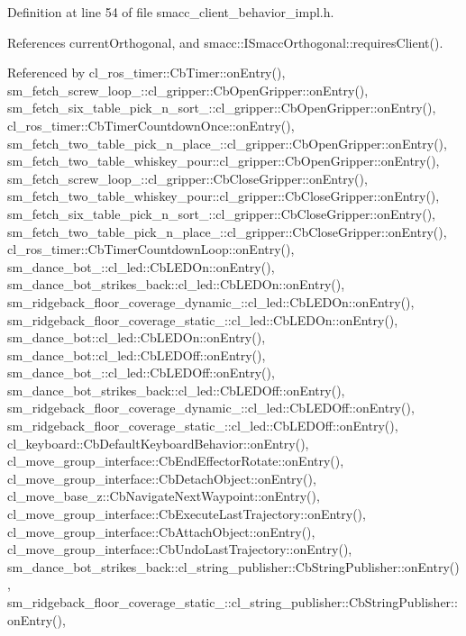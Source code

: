 Definition at line 54 of file smacc\+\_\+client\+\_\+behavior\+\_\+impl.\+h.



References current\+Orthogonal, and smacc\+::\+I\+Smacc\+Orthogonal\+::requires\+Client().



Referenced by cl\+\_\+ros\+\_\+timer\+::\+Cb\+Timer\+::on\+Entry(), sm\+\_\+fetch\+\_\+screw\+\_\+loop\+\_\+::cl\+\_\+gripper\+::\+Cb\+Open\+Gripper\+::on\+Entry(), sm\+\_\+fetch\+\_\+six\+\_\+table\+\_\+pick\+\_\+n\+\_\+sort\+\_\+::cl\+\_\+gripper\+::\+Cb\+Open\+Gripper\+::on\+Entry(), cl\+\_\+ros\+\_\+timer\+::\+Cb\+Timer\+Countdown\+Once\+::on\+Entry(), sm\+\_\+fetch\+\_\+two\+\_\+table\+\_\+pick\+\_\+n\+\_\+place\+\_\+::cl\+\_\+gripper\+::\+Cb\+Open\+Gripper\+::on\+Entry(), sm\+\_\+fetch\+\_\+two\+\_\+table\+\_\+whiskey\+\_\+pour\+::cl\+\_\+gripper\+::\+Cb\+Open\+Gripper\+::on\+Entry(), sm\+\_\+fetch\+\_\+screw\+\_\+loop\+\_\+::cl\+\_\+gripper\+::\+Cb\+Close\+Gripper\+::on\+Entry(), sm\+\_\+fetch\+\_\+two\+\_\+table\+\_\+whiskey\+\_\+pour\+::cl\+\_\+gripper\+::\+Cb\+Close\+Gripper\+::on\+Entry(), sm\+\_\+fetch\+\_\+six\+\_\+table\+\_\+pick\+\_\+n\+\_\+sort\+\_\+::cl\+\_\+gripper\+::\+Cb\+Close\+Gripper\+::on\+Entry(), sm\+\_\+fetch\+\_\+two\+\_\+table\+\_\+pick\+\_\+n\+\_\+place\+\_\+::cl\+\_\+gripper\+::\+Cb\+Close\+Gripper\+::on\+Entry(), cl\+\_\+ros\+\_\+timer\+::\+Cb\+Timer\+Countdown\+Loop\+::on\+Entry(), sm\+\_\+dance\+\_\+bot\+\_\+::cl\+\_\+led\+::\+Cb\+L\+E\+D\+On\+::on\+Entry(), sm\+\_\+dance\+\_\+bot\+\_\+strikes\+\_\+back\+::cl\+\_\+led\+::\+Cb\+L\+E\+D\+On\+::on\+Entry(), sm\+\_\+ridgeback\+\_\+floor\+\_\+coverage\+\_\+dynamic\+\_\+::cl\+\_\+led\+::\+Cb\+L\+E\+D\+On\+::on\+Entry(), sm\+\_\+ridgeback\+\_\+floor\+\_\+coverage\+\_\+static\+\_\+::cl\+\_\+led\+::\+Cb\+L\+E\+D\+On\+::on\+Entry(), sm\+\_\+dance\+\_\+bot\+::cl\+\_\+led\+::\+Cb\+L\+E\+D\+On\+::on\+Entry(), sm\+\_\+dance\+\_\+bot\+::cl\+\_\+led\+::\+Cb\+L\+E\+D\+Off\+::on\+Entry(), sm\+\_\+dance\+\_\+bot\+\_\+::cl\+\_\+led\+::\+Cb\+L\+E\+D\+Off\+::on\+Entry(), sm\+\_\+dance\+\_\+bot\+\_\+strikes\+\_\+back\+::cl\+\_\+led\+::\+Cb\+L\+E\+D\+Off\+::on\+Entry(), sm\+\_\+ridgeback\+\_\+floor\+\_\+coverage\+\_\+dynamic\+\_\+::cl\+\_\+led\+::\+Cb\+L\+E\+D\+Off\+::on\+Entry(), sm\+\_\+ridgeback\+\_\+floor\+\_\+coverage\+\_\+static\+\_\+::cl\+\_\+led\+::\+Cb\+L\+E\+D\+Off\+::on\+Entry(), cl\+\_\+keyboard\+::\+Cb\+Default\+Keyboard\+Behavior\+::on\+Entry(), cl\+\_\+move\+\_\+group\+\_\+interface\+::\+Cb\+End\+Effector\+Rotate\+::on\+Entry(), cl\+\_\+move\+\_\+group\+\_\+interface\+::\+Cb\+Detach\+Object\+::on\+Entry(), cl\+\_\+move\+\_\+base\+\_\+z\+::\+Cb\+Navigate\+Next\+Waypoint\+::on\+Entry(), cl\+\_\+move\+\_\+group\+\_\+interface\+::\+Cb\+Execute\+Last\+Trajectory\+::on\+Entry(), cl\+\_\+move\+\_\+group\+\_\+interface\+::\+Cb\+Attach\+Object\+::on\+Entry(), cl\+\_\+move\+\_\+group\+\_\+interface\+::\+Cb\+Undo\+Last\+Trajectory\+::on\+Entry(), sm\+\_\+dance\+\_\+bot\+\_\+strikes\+\_\+back\+::cl\+\_\+string\+\_\+publisher\+::\+Cb\+String\+Publisher\+::on\+Entry(), sm\+\_\+ridgeback\+\_\+floor\+\_\+coverage\+\_\+static\+\_\+::cl\+\_\+string\+\_\+publisher\+::\+Cb\+String\+Publisher\+::on\+Entry(), 